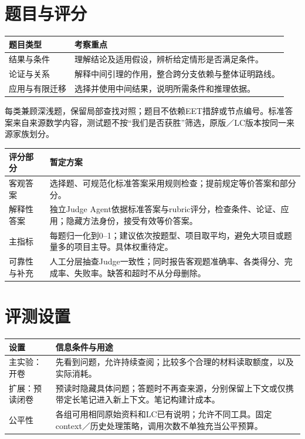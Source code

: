 \documentclass[UTF8,10pt,fontset=none]{ctexart}
\begin{document}
\section*{题目与评分}
\begin{tabularx}{\textwidth}{@{}p{31mm}Y@{}}
\toprule
题目类型 & 考察重点 \\
\midrule
结果与条件 & 理解结论及适用假设，辨析给定情形是否满足条件。\\
论证与关系 & 解释中间引理的作用，整合跨分支依赖与整体证明路线。\\
应用与有限迁移 & 选择并使用中间结果，说明所需条件和推理依据。\\
\bottomrule
\end{tabularx}

每类兼顾深浅题，保留局部查找对照；题目不依赖EET措辞或节点编号。标准答案来自来源数学内容，测试题不按“我们是否获胜”筛选，原版／LC版本按同一来源家族划分。

\begin{tabularx}{\textwidth}{@{}p{31mm}Y@{}}
\toprule
评分部分 & 暂定方案 \\
\midrule
客观答案 & 选择题、可规范化标准答案采用规则检查；提前规定等价答案和部分分。\\
解释性答案 & 独立Judge Agent依据标准答案与rubric评分，检查条件、论证、应用；隐藏方法身份，接受有效等价答案。\\
主指标 & 每题归一化到0--1；建议依次按题型、项目取平均，避免大项目或题量多的项目主导。具体权重待定。\\
可靠性与补充 & 人工分层抽查Judge一致性；同时报告客观题准确率、各类得分、完成率、失败率。缺答和超时不从分母删除。\\
\bottomrule
\end{tabularx}

\section*{评测设置}
\begin{tabularx}{\textwidth}{@{}p{31mm}Y@{}}
\toprule
设置 & 信息条件与用途 \\
\midrule
主实验：开卷 & 先看到问题，允许持续查阅；比较多个合理的材料读取额度，以及实际消耗。\\
扩展：预读闭卷 & 预读时隐藏具体问题；答题时不再查来源，分别保留上下文或仅携带定长笔记进入新上下文。笔记构建计成本。\\
公平性 & 各组可用相同原始资料和LC已有说明；允许不同工具。固定context／历史处理策略，调用次数不单独充当公平预算。\\
\bottomrule
\end{tabularx}
\end{document}
